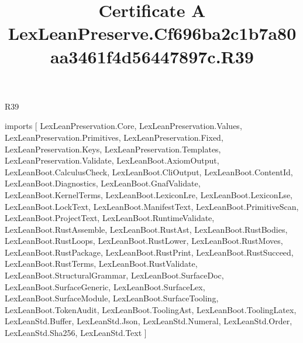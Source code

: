 \begin{lexlean}{R39}
\title{Certificate A LexLeanPreserve.Cf696ba2c1b7a80aa3461f4d56447897c.R39}
\begin{coremodule}
imports [
  LexLeanPreservation.Core,
  LexLeanPreservation.Values,
  LexLeanPreservation.Primitives,
  LexLeanPreservation.Fixed,
  LexLeanPreservation.Keys,
  LexLeanPreservation.Templates,
  LexLeanPreservation.Validate,
  LexLeanBoot.AxiomOutput,
  LexLeanBoot.CalculusCheck,
  LexLeanBoot.CliOutput,
  LexLeanBoot.ContentId,
  LexLeanBoot.Diagnostics,
  LexLeanBoot.GnafValidate,
  LexLeanBoot.KernelTerms,
  LexLeanBoot.LexiconLre,
  LexLeanBoot.LexiconLse,
  LexLeanBoot.LockText,
  LexLeanBoot.ManifestText,
  LexLeanBoot.PrimitiveScan,
  LexLeanBoot.ProjectText,
  LexLeanBoot.RuntimeValidate,
  LexLeanBoot.RustAssemble,
  LexLeanBoot.RustAst,
  LexLeanBoot.RustBodies,
  LexLeanBoot.RustLoops,
  LexLeanBoot.RustLower,
  LexLeanBoot.RustMoves,
  LexLeanBoot.RustPackage,
  LexLeanBoot.RustPrint,
  LexLeanBoot.RustSucceed,
  LexLeanBoot.RustTerms,
  LexLeanBoot.RustValidate,
  LexLeanBoot.StructuralGrammar,
  LexLeanBoot.SurfaceDoc,
  LexLeanBoot.SurfaceGeneric,
  LexLeanBoot.SurfaceLex,
  LexLeanBoot.SurfaceModule,
  LexLeanBoot.SurfaceTooling,
  LexLeanBoot.TokenAudit,
  LexLeanBoot.ToolingAst,
  LexLeanBoot.ToolingLatex,
  LexLeanStd.Buffer,
  LexLeanStd.Json,
  LexLeanStd.Numeral,
  LexLeanStd.Order,
  LexLeanStd.Sha256,
  LexLeanStd.Text
]


\end{coremodule}
\end{lexlean}
